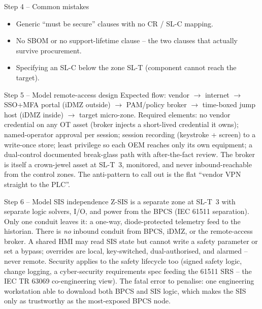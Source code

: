 \documentclass[11pt,a4paper]{article}
\begin{document}
\begin{solutionbox}{Step 4 -- Common mistakes}
\begin{itemize}\setlength{\itemsep}{1pt}
  \item Generic ``must be secure'' clauses with no CR / SL-C mapping.
  \item No SBOM or no support-lifetime clause -- the two clauses that
    actually survive procurement.
  \item Specifying an SL-C below the zone SL-T (component cannot reach
    the target).
\end{itemize}
\end{solutionbox}

\begin{solutionbox}{Step 5 -- Model remote-access design}
Expected flow: vendor $\to$ internet $\to$ SSO+MFA portal (iDMZ
outside) $\to$ PAM/policy broker $\to$ time-boxed jump host (iDMZ
inside) $\to$ target micro-zone. Required elements: no vendor credential
on any OT asset (broker injects a short-lived credential it owns);
named-operator approval per session; session recording (keystroke +
screen) to a write-once store; least privilege so each OEM reaches only
its own equipment; a dual-control documented break-glass path with
after-the-fact review. The broker is itself a crown-jewel asset at
SL-T~3, monitored, and never inbound-reachable from the control zones.
The anti-pattern to call out is the flat ``vendor VPN straight to the
PLC''.
\end{solutionbox}

\begin{solutionbox}{Step 6 -- Model SIS independence}
Z-SIS is a separate zone at SL-T~3 with separate logic solvers, I/O, and
power from the BPCS (IEC 61511 separation). Only one conduit leaves it: a
one-way, diode-protected telemetry feed to the historian. There is
\emph{no} inbound conduit from BPCS, iDMZ, or the remote-access broker.
A shared HMI may read SIS state but cannot write a safety parameter or
set a bypass; overrides are local, key-switched, dual-authorised, and
alarmed -- never remote. Security applies to the safety lifecycle too
(signed safety logic, change logging, a cyber-security requirements spec
feeding the 61511 SRS -- the IEC TR 63069 co-engineering view). The
fatal error to penalise: one engineering workstation able to download
both BPCS and SIS logic, which makes the SIS only as trustworthy as the
most-exposed BPCS node.
\end{solutionbox}
\end{document}
